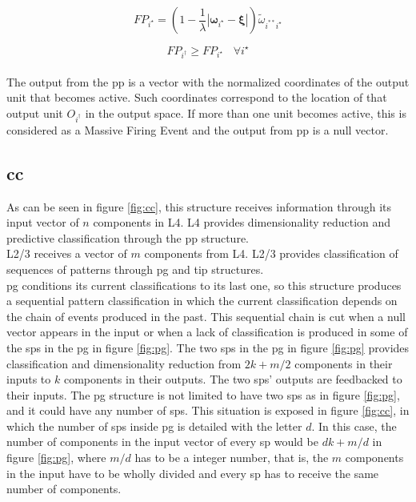\documentclass[11pt,a4paper]{article}
\begin{document}
\begin{appendices}
\begin{equation} \label{firingPredisposition}
FP_{i^{\star}} = \left (1 - \frac{1}{\lambda} |\boldsymbol{\omega}_{i^{\star}} - \boldsymbol{\xi}| \right ) \tilde{\omega}_{i^{**}i^{\star}}
\end{equation}

\begin{equation} \label{activationRule}
FP_{i^{\dagger}} \geq FP_{i^{\star}} ~~~~ \forall i^{\star}
\end{equation}\\

The output from the \ac{pp} is a vector with the normalized coordinates of the output unit that becomes active.
Such coordinates correspond to the location of that output unit $O_{i^{\dagger}}$ in the output space.
If more than one unit becomes active, this is considered as a Massive Firing Event
and the output from \ac{pp} is a null vector.\\

\subsection{\ac{cc}} \label{cc}

As can be seen in figure \ref{fig:cc}, this structure receives information
through its input vector of $n$ components in L4.
L4 provides dimensionality reduction and predictive classification
through the \ac{pp} structure.\\

L2/3 receives a vector of $m$ components from L4.
L2/3 provides classification of sequences of patterns through \ac{pg} and \ac{tip}
structures.\\

\ac{pg} conditions its current classifications to its last one,
so this structure produces a sequential pattern classification in which
the current classification depends on the chain of events produced in the past.
This sequential chain is cut when a null vector appears in the input or when
a lack of classification is produced in some of the \ac{sp}s in the \ac{pg}
in figure \ref{fig:pg}.
The two \ac{sp}s in the \ac{pg} in figure \ref{fig:pg} provides classification and
dimensionality reduction from $2k + m/2$ components in their inputs to $k$ components in their outputs.
The two \ac{sp}s' outputs are feedbacked to their inputs.
The \ac{pg} structure is not limited to have two \ac{sp}s as in figure \ref{fig:pg},
and it could have any number of \ac{sp}s.
This situation is exposed in figure \ref{fig:cc}, in which the number of \ac{sp}s inside \ac{pg} is
detailed with the letter $d$.
In this case, the number of components in the input vector of every \ac{sp} would be $dk+m/d$ in figure \ref{fig:pg},
where $m/d$ has to be a integer number, that is, the $m$ components in the input have to be wholly
divided and every \ac{sp} has to receive the same number of components.\\


\end{appendices}
\end{document}

